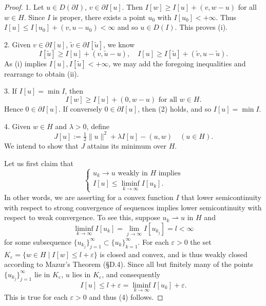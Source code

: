 \begin{proof}
1. Let $u \in D(\partial I)$, $v \in \partial I[u]$. Then $I[w] \geq I[u] + (v, w - u)$ for all $w \in H$. Since $I$ is proper, there exists a point $u_0$ with $I[u_0] < +\infty$. Thus $I[u] \leq I[u_0] + (v, u - u_0) < \infty$ and so $u \in D(I)$. This proves (i).

2. Given $v \in \partial I[u]$, $\tilde{v} \in \partial I[\tilde{u}]$, we know
\[
I[\tilde{u}] \geq I[u] + (v, \tilde{u} - u), \quad I[u] \geq I[\tilde{u}] + (\tilde{v}, u - \tilde{u}).
\]
As (i) implies $I[u], I[\tilde{u}] < +\infty$, we may add the foregoing inequalities and rearrange to obtain (ii).

3. If $I[u] = \min I$, then
\[
I[w] \geq I[u] + (0, w - u) \text{ for all } w \in H.
\tag{2}
\]
Hence $0 \in \partial I[u]$. If conversely $0 \in \partial I[u]$, then (2) holds, and so $I[u] = \min I$.

4. Given $w \in H$ and $\lambda > 0$, define
\[
J[u] := \tfrac{1}{2}\|u\|^2 + \lambda I[u] - (u, w) \quad (u \in H).
\tag{3}
\]
We intend to show that $J$ attains its minimum over $H$.

Let us first claim that
\[
\begin{cases} u_k \to u \text{ weakly in } H \text{ implies} \\ I[u] \leq \liminf_{k \to \infty} I[u_k]. \end{cases}
\tag{4}
\]
In other words, we are asserting for a convex function $I$ that lower semicontinuity with respect to strong convergence of sequences implies lower semicontinuity with respect to weak convergence. To see this, suppose $u_k \rightharpoonup u$ in $H$ and
\[
\liminf_{k \to \infty} I[u_k] = \lim_{j \to \infty} I[u_{k_j}] = l < \infty
\]
for some subsequence $\{u_{k_j}\}_{j=1}^\infty \subset \{u_k\}_{k=1}^\infty$. For each $\varepsilon > 0$ the set $K_\varepsilon = \{w \in H \mid I[w] \le l+\varepsilon\}$ is closed and convex, and is thus weakly closed according to Mazur's Theorem (\S D.4). Since all but finitely many of the points $\{u_{k_j}\}_{j=1}^\infty$ lie in $K_\varepsilon$, $u$ lies in $K_\varepsilon$, and consequently
\[
I[u] \le l + \varepsilon = \liminf_{k \to \infty} I[u_k] + \varepsilon.
\]
This is true for each $\varepsilon > 0$ and thus (4) follows.


\end{proof}
